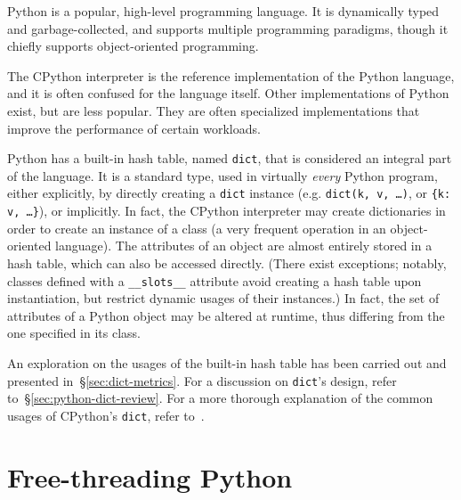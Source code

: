 Python is a popular, high-level programming language.
It is dynamically typed and garbage-collected, and supports multiple programming paradigms, though it chiefly supports object-oriented programming.

The CPython interpreter is the reference implementation of the Python language, and it is often confused for the language itself.
Other implementations of Python exist, but are less popular.
They are often specialized implementations that improve the performance of certain workloads.

Python has a built-in hash table, named \texttt{dict}, that is considered an integral part of the language.
It is a standard type, used in virtually \emph{every} Python program, either explicitly, by directly creating a \texttt{dict} instance (e.g. \texttt{{dict(k, v, \ldots)}}, or \texttt{\{k: v, \ldots\}}), or implicitly.
In fact, the CPython interpreter may create dictionaries in order to create an instance of a class (a very frequent operation in an object-oriented language).
The attributes of an object are almost entirely stored in a hash table, which can also be accessed directly.
(There exist exceptions; notably, classes defined with a \texttt{{\_\_slots\_\_}} attribute avoid creating a hash table upon instantiation, but restrict dynamic usages of their instances.)
In fact, the set of attributes of a Python object may be altered at runtime, thus differing from the one specified in its class.

An exploration on the usages of the built-in hash table has been carried out and presented in~\S\ref{sec:dict-metrics}.
For a discussion on \texttt{dict}'s design, refer to~\S\ref{sec:python-dict-review}.
For a more thorough explanation of the common usages of CPython's \texttt{dict}, refer to~\cite[\S Principal Use Cases for Dictionaries]{dict-notes}.


\section{Free-threading Python}\label{sec:free-threading}

